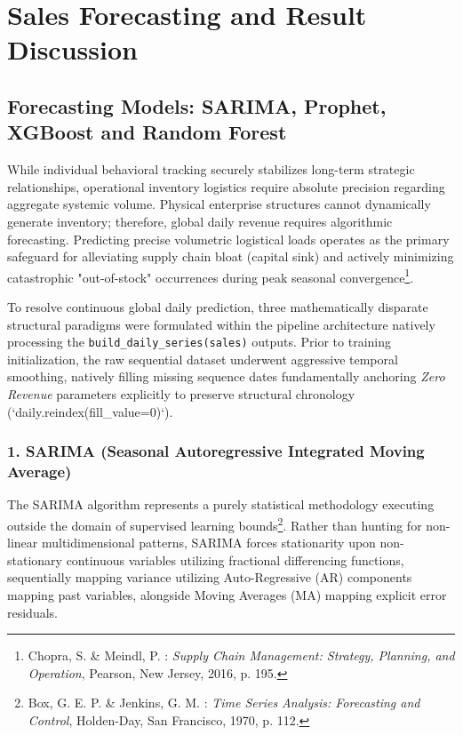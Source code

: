 \documentclass[12pt,a4paper]{report}
\begin{document}
\section{Sales Forecasting and Result Discussion}

\subsection{Forecasting Models: SARIMA, Prophet, XGBoost and Random Forest}
While individual behavioral tracking securely stabilizes long-term strategic relationships, operational inventory logistics require absolute precision regarding aggregate systemic volume. Physical enterprise structures cannot dynamically generate inventory; therefore, global daily revenue requires algorithmic forecasting. Predicting precise volumetric logistical loads operates as the primary safeguard for alleviating supply chain bloat (capital sink) and actively minimizing catastrophic "out-of-stock" occurrences during peak seasonal convergence\footnote{Chopra, S. \& Meindl, P. : \textit{Supply Chain Management: Strategy, Planning, and Operation}, Pearson, New Jersey, 2016, p. 195.}. 

To resolve continuous global daily prediction, three mathematically disparate structural paradigms were formulated within the pipeline architecture natively processing the \texttt{build\_daily\_series(sales)} outputs. Prior to training initialization, the raw sequential dataset underwent aggressive temporal smoothing, natively filling missing sequence dates fundamentally anchoring \textit{Zero Revenue} parameters explicitly to preserve structural chronology (`daily.reindex(fill_value=0)`).

\subsubsection{1. SARIMA (Seasonal Autoregressive Integrated Moving Average)}
The SARIMA algorithm represents a purely statistical methodology executing outside the domain of supervised learning bounds\footnote{Box, G. E. P. \& Jenkins, G. M. : \textit{Time Series Analysis: Forecasting and Control}, Holden-Day, San Francisco, 1970, p. 112.}. Rather than hunting for non-linear multidimensional patterns, SARIMA forces stationarity upon non-stationary continuous variables utilizing fractional differencing functions, sequentially mapping variance utilizing Auto-Regressive (AR) components mapping past variables, alongside Moving Averages (MA) mapping explicit error residuals.
\end{document}
